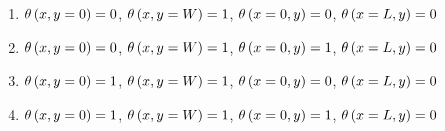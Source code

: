 \documentclass[12pt,letterpaper]{article}
\begin{document}
\begin{enumerate}
	\begin{enumerate}
		\item $\theta \left( x, y = 0 \right) = 0$, $\theta \left( x, y = W \right) = 1$, $\theta \left( x = 0, y \right) = 0$, $\theta \left( x = L, y \right) = 0$
		\item $\theta \left( x, y = 0 \right) = 0$, $\theta \left( x, y = W \right) = 1$, $\theta \left( x = 0, y \right) = 1$, $\theta \left( x = L, y \right) = 0$
		\item $\theta \left( x, y = 0 \right) = 1$, $\theta \left( x, y = W \right) = 1$, $\theta \left( x = 0, y \right) = 0$, $\theta \left( x = L, y \right) = 0$
		\item $\theta \left( x, y = 0 \right) = 1$, $\theta \left( x, y = W \right) = 1$, $\theta \left( x = 0, y \right) = 1$, $\theta \left( x = L, y \right) = 0$
	\end{enumerate}


\end{enumerate}
\end{document}
